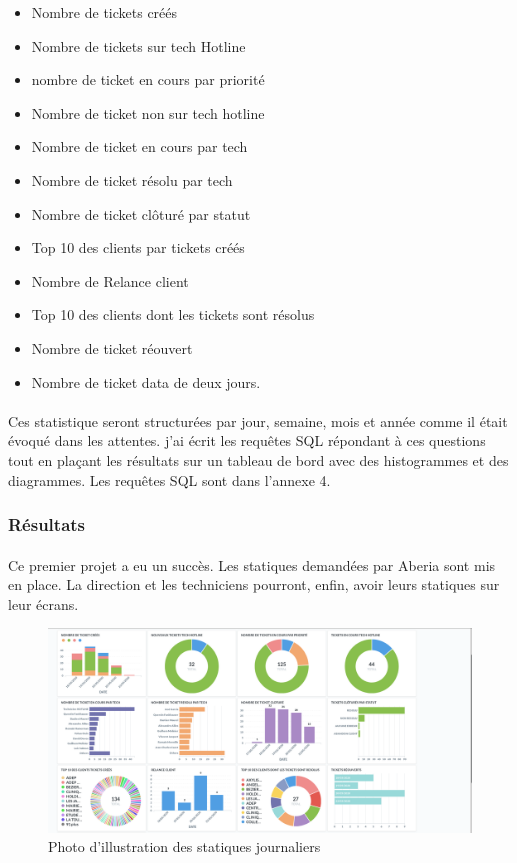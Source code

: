 \documentclass[a4paper,12pt]{report}
\begin{document}
\begin{itemize}
 \item Nombre de tickets créés 
 \item Nombre de tickets sur tech Hotline 
 \item nombre de ticket en cours par priorité 
 \item Nombre de ticket non sur tech hotline 
 \item Nombre de ticket en cours par tech
 \item Nombre de ticket résolu par tech 
 \item Nombre de ticket clôturé par statut
 \item Top 10 des clients par tickets créés
 \item Nombre de Relance client
 \item Top 10 des clients dont les tickets sont résolus 
 \item Nombre de ticket réouvert
 \item Nombre de ticket data de deux jours.
\end{itemize}

\paragraph*{}
               Ces statistique seront structurées par jour, semaine, mois et année comme il était évoqué dans les attentes. 
               j’ai écrit les requêtes SQL répondant à ces questions tout en plaçant les résultats sur un tableau de bord avec des histogrammes et des diagrammes. Les requêtes SQL sont dans l’annexe 4.
\subsubsection{Résultats}

\paragraph*{}
Ce premier projet a eu un succès. Les statiques demandées par Aberia sont mis en place. La direction et les techniciens pourront, enfin, avoir leurs statiques sur leur écrans. 
\begin{figure}[!h]
\begin{center}
\includegraphics[width=20cm]{image/projet1.png}
\end{center}
\caption{Photo d'illustration des statiques journaliers}
\label{Photo d'illustration}
\end{figure}
\end{document}

